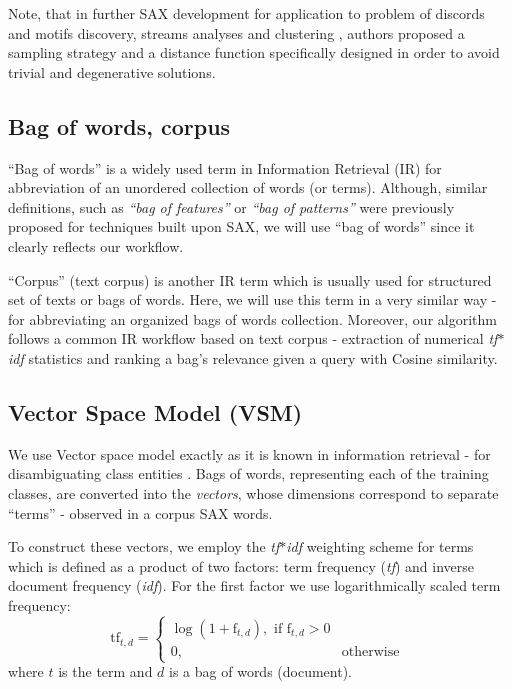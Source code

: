 \documentclass{llncs}
\begin{document}
Note, that in further SAX development \cite{hot_sax}for application to problem of discords
and motifs discovery, streams analyses and clustering \cite{streaming_sax}, authors
proposed a sampling strategy and a distance function specifically designed in order to avoid trivial
and degenerative solutions. 

\subsection{Bag of words, corpus}
``Bag of words'' is a widely used term in Information Retrieval (IR) for abbreviation of an
unordered collection of words (or terms). Although, similar definitions, such as \textit{``bag of
features''} \cite{bag_features} or \textit{``bag of patterns''} \cite{bag_patterns} were previously
proposed for techniques built upon SAX, we will use ``bag of words'' since it clearly reflects our
workflow. 

``Corpus'' (text corpus) is another IR term which is usually used for structured set of texts or
bags of words. Here, we will use this term in a very similar way - for abbreviating an organized
bags of words collection. Moreover, our algorithm follows a common IR workflow based on text corpus
- extraction of numerical \textit{tf$\ast$idf} statistics and ranking a bag's relevance given a
query with Cosine similarity.

\subsection{Vector Space Model (VSM)}
We use Vector space model exactly as it is known in information retrieval - for disambiguating class
entities \cite{salton}. Bags of words, representing each of the training classes, are converted into
the \textit{vectors}, whose dimensions correspond to separate “terms” - observed in a corpus SAX
words. 

To construct these vectors, we employ the \textit{tf$\ast$idf} weighting scheme for terms which is
defined as a product of two factors: term frequency (\textit{tf}) and inverse document frequency
(\textit{idf}). For the first factor we use logarithmically scaled term frequency:
\begin{equation}
 \mbox{tf}_{t, d} =  \begin{cases} \log(1 + \mbox{f}_{t,d}), \mbox{ if f}_{t,d}>0  \\
0, & \mbox{otherwise } \end{cases}
\end{equation} 
where $t$ is the term and $d$ is a bag of words (document).
\end{document}
